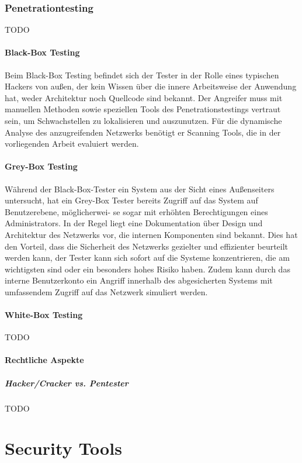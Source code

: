 \documentclass[12pt,oneside,a4paper,parskip]{scrbook}
\begin{document}
    \subsubsection{Penetrationtesting}
    TODO

    \paragraph{Black-Box Testing}
    Beim Black-Box Testing befindet sich der Tester in der Rolle eines typischen Hackers von
    außen, der kein Wissen über die innere Arbeitsweise der Anwendung hat, weder Architektur noch
    Quellcode sind bekannt. Der Angreifer muss mit manuellen Methoden sowie speziellen Tools des Penetrationstestings vertraut sein, um Schwachstellen zu lokalisieren und auszunutzen. Für die dynamische Analyse des anzugreifenden Netzwerks benötigt er Scanning Tools, die in der vorliegenden Arbeit evaluiert werden.

    \paragraph{Grey-Box Testing}
    Während der Black-Box-Tester ein System aus der Sicht eines Außenseiters untersucht, hat ein    Grey-Box Tester bereits Zugriff auf das System auf Benutzerebene, möglicherwei- se sogar mit    erhöhten Berechtigungen eines Administrators. In der Regel liegt eine Dokumentation über Design und Architektur des Netzwerks vor, die internen Komponenten sind bekannt. Dies hat den Vorteil, dass die Sicherheit des Netzwerks gezielter und effizienter beurteilt werden kann, der Tester kann sich sofort auf die Systeme konzentrieren, die am wichtigsten sind oder ein besonders hohes Risiko haben. Zudem kann durch das interne Benutzerkonto ein Angriff innerhalb des abgesicherten Systems mit umfassendem Zugriff auf das Netzwerk simuliert werden.

    \paragraph{White-Box Testing}
    TODO
    \paragraph{Rechtliche Aspekte}
      \subparagraph{Hacker/Cracker vs. Pentester}
      TODO

  \section{Security Tools}
\end{document}
